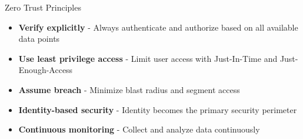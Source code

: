 \begin{concept}{Zero Trust Principles}
\begin{itemize}
    \item \textbf{Verify explicitly} - Always authenticate and authorize based on all available data points
    \item \textbf{Use least privilege access} - Limit user access with Just-In-Time and Just-Enough-Access
    \item \textbf{Assume breach} - Minimize blast radius and segment access
    \item \textbf{Identity-based security} - Identity becomes the primary security perimeter
    \item \textbf{Continuous monitoring} - Collect and analyze data continuously
\end{itemize}
\end{concept}


